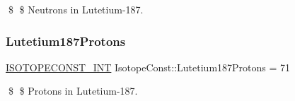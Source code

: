 \$ \$ Neutrons in Lutetium-\/187. \mbox{\label{group___isotope_const-_lutetium-_lu187_ga55624b3261ca8555012f47bcacd0ffc9}} 
\subsubsection{\texorpdfstring{Lutetium187\+Protons}{Lutetium187Protons}}
{\footnotesize\ttfamily \mbox{\hyperlink{group___isotope_const-_macros_ga5f18360b3e99483a35c32d789e62621c}{I\+S\+O\+T\+O\+P\+E\+C\+O\+N\+S\+T\+\_\+\+I\+NT}} Isotope\+Const\+::\+Lutetium187\+Protons = 71}

\$ \$ Protons in Lutetium-\/187. 